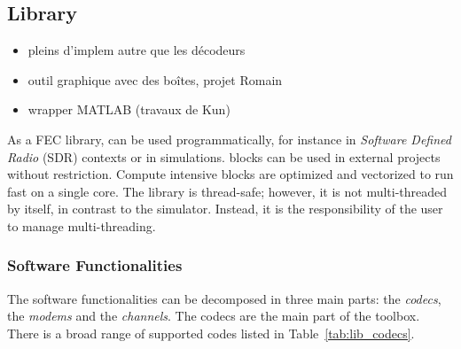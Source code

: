 \subsection{Library~\cite{Cassagne2019a}}

\begin{itemize}
  \item pleins d'implem autre que les décodeurs
  \item outil graphique avec des boîtes, projet Romain
  \item wrapper MATLAB (travaux de Kun)
\end{itemize}

As a FEC library, \AFFECT can be used programmatically, for instance in
\emph{Software Defined Radio} (SDR) contexts or in simulations. \AFFECT blocks
can be used in external projects without restriction. Compute intensive blocks
are optimized and vectorized to run fast on a single core. The library is
thread-safe; however, it is not multi-threaded by itself, in contrast to the
simulator. Instead, it is the responsibility of the user to manage
multi-threading.

\subsubsection{Software Functionalities}

The \AFFECT software functionalities can be decomposed in three main parts: the
\textit{codecs}, the \textit{modems} and the \textit{channels}. The codecs are
the main part of the toolbox. There is a broad range of supported codes listed
in Table~\ref{tab:lib_codecs}.

